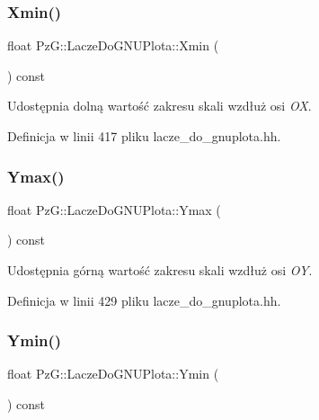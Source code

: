 \subsubsection{\texorpdfstring{Xmin()}{Xmin()}}
{\footnotesize\ttfamily float Pz\+G\+::\+Lacze\+Do\+G\+N\+U\+Plota\+::\+Xmin (\begin{DoxyParamCaption}{ }\end{DoxyParamCaption}) const\hspace{0.3cm}{\ttfamily [inline]}}

Udostępnia dolną wartość zakresu skali wzdłuż osi {\itshape OX}. 

Definicja w linii 417 pliku lacze\+\_\+do\+\_\+gnuplota.\+hh.

\mbox{\label{class_pz_g_1_1_lacze_do_g_n_u_plota_ac54e4e7448ce3bd324efdc94a999f535}} 
\subsubsection{\texorpdfstring{Ymax()}{Ymax()}}
{\footnotesize\ttfamily float Pz\+G\+::\+Lacze\+Do\+G\+N\+U\+Plota\+::\+Ymax (\begin{DoxyParamCaption}{ }\end{DoxyParamCaption}) const\hspace{0.3cm}{\ttfamily [inline]}}

Udostępnia górną wartość zakresu skali wzdłuż osi {\itshape OY}. 

Definicja w linii 429 pliku lacze\+\_\+do\+\_\+gnuplota.\+hh.

\mbox{\label{class_pz_g_1_1_lacze_do_g_n_u_plota_a9352c0382bfaeaaba9f65399a7383164}} 
\subsubsection{\texorpdfstring{Ymin()}{Ymin()}}
{\footnotesize\ttfamily float Pz\+G\+::\+Lacze\+Do\+G\+N\+U\+Plota\+::\+Ymin (\begin{DoxyParamCaption}{ }\end{DoxyParamCaption}) const\hspace{0.3cm}{\ttfamily [inline]}}

